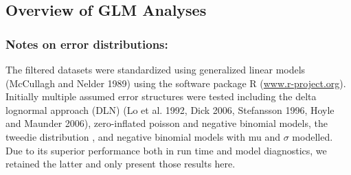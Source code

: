                                                                                        
                                                                                       
   \subsection{Overview of GLM Analyses}
   \subsubsection{Notes on error distributions:} 

   The  filtered datasets  were standardized using generalized linear models (McCullagh and Nelder 1989) using the software package R (\url{www.r-project.org}). Initially multiple assumed error structures were tested including the delta lognormal approach (DLN) (Lo et al. 1992, Dick 2006, Stefansson 1996, Hoyle and Maunder 2006), zero-inflated poisson and negative binomial models, the tweedie distribution \citep{Shono2008},%
   and negative binomial models with mu and  $\sigma$ modelled. Due to its superior performance both in run time and model diagnostics, we retained the latter and only present those results here.

